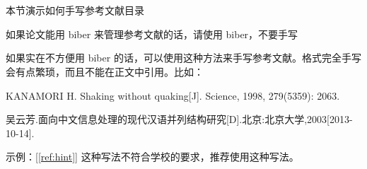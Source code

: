 \chapter*{\bibname}

\begin{manref}
\item \label{ref:hint} 本节演示如何手写参考文献目录
\item 如果论文能用 biber 来管理参考文献的话，请使用 biber，不要手写
\item 如果实在不方便用 biber 的话，可以使用这种方法来手写参考文献。格式完全手写会有点繁琐，而且不能在正文中引用。比如：
\item \label{ref:man} KANAMORI H. Shaking without quaking[J]. Science, 1998, 279(5359): 2063.
\item 吴云芳.面向中文信息处理的现代汉语并列结构研究[D].北京:北京大学,2003[2013-10-14].
\end{manref}

示例：[\ref{ref:hint}] 这种写法不符合学校的要求，推荐使用这种写法。
